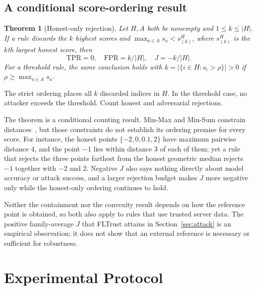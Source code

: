 \documentclass[journal]{IEEEtran}
\newtheorem{theorem}{Theorem}
\begin{document}
\subsection{A conditional score-ordering result}
\begin{theorem}[Honest-only rejection]\label{thm:inversion}
Let $H,A$ both be nonempty and $1\leq k\leq|H|$. If a rule discards the $k$ highest scores and $\max_{a\in A}s_a<s^H_{(k)}$, where $s^H_{(k)}$ is the $k$th largest honest score, then
\[
\mathrm{TPR}=0,\quad\mathrm{FPR}=k/|H|,\quad J=-k/|H|.
\]
For a threshold rule, the same conclusion holds with $k=|\{i\in H:s_i>\rho\}|>0$ if $\rho\geq\max_{a\in A}s_a$.
\end{theorem}
\begin{IEEEproof}
The strict ordering places all $k$ discarded indices in $H$. In the threshold case, no attacker exceeds the threshold. Count honest and adversarial rejections.
\end{IEEEproof}
The theorem is a conditional counting result. Min-Max and Min-Sum constrain distances~\cite{shejwalkar2021}, but those constraints do not establish its ordering premise for every score. For instance, the honest points $\{-2,0,0.1,2\}$ have maximum pairwise distance 4, and the point $-1$ lies within distance 3 of each of them; yet a rule that rejects the three points farthest from the honest geometric median rejects $-1$ together with $-2$ and $2$. Negative $J$ also says nothing directly about model accuracy or attack success, and a larger rejection budget makes $J$ more negative only while the honest-only ordering continues to hold.

Neither the containment nor the convexity result depends on how the reference point is obtained, so both also apply to rules that use trusted server data. The positive family-average $J$ that FLTrust attains in Section~\ref{sec:attack} is an empirical observation; it does not show that an external reference is necessary or sufficient for robustness.

\section{Experimental Protocol}\label{sec:protocol}

\end{document}
